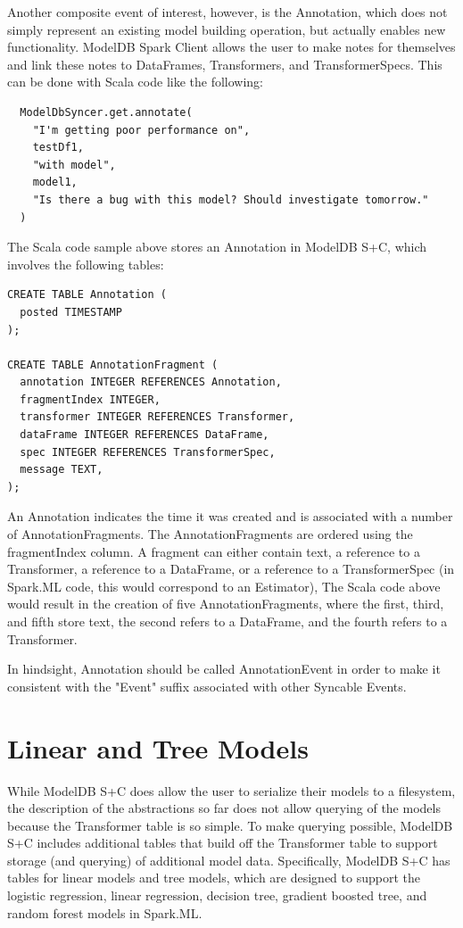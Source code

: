 Another composite event of interest, however, is the Annotation, which does not simply represent
an existing model building operation, but actually enables new functionality. ModelDB Spark Client allows the user
to make notes for themselves and link these notes to DataFrames, Transformers, and TransformerSpecs. This can be done
with Scala code like the following:

\begin{verbatim}
  ModelDbSyncer.get.annotate(
    "I'm getting poor performance on", 
    testDf1, 
    "with model", 
    model1, 
    "Is there a bug with this model? Should investigate tomorrow."
  )
\end{verbatim}

The Scala code sample above stores an Annotation in ModelDB S+C, which involves
the following tables:

\begin{verbatim}
CREATE TABLE Annotation (
  posted TIMESTAMP
);

CREATE TABLE AnnotationFragment (
  annotation INTEGER REFERENCES Annotation,
  fragmentIndex INTEGER,
  transformer INTEGER REFERENCES Transformer,
  dataFrame INTEGER REFERENCES DataFrame,
  spec INTEGER REFERENCES TransformerSpec,
  message TEXT,
);
\end{verbatim}

An Annotation indicates the time it was created and is associated with a number
of AnnotationFragments. The AnnotationFragments are ordered using the fragmentIndex
column. A fragment can either contain text, a reference to a Transformer, a reference
to a DataFrame, or a reference to a TransformerSpec (in Spark.ML code, this would
correspond to an Estimator), The Scala code above would result in the creation
of five AnnotationFragments, where the first, third, and fifth store text, the second
refers to a DataFrame, and the fourth refers to a Transformer.

In hindsight, Annotation should be called AnnotationEvent in order to make
it consistent with the "Event" suffix associated with other Syncable Events.

\section{Linear and Tree Models}

While ModelDB S+C does allow the user to serialize their models to a filesystem,
the description of the abstractions so far does not allow querying of the models
because the Transformer table is so simple. To make querying possible, ModelDB S+C
includes additional tables that build off the Transformer table to support storage
(and querying) of additional model data. Specifically, ModelDB S+C has tables for
linear models and tree models, which are designed to support the logistic regression,
linear regression, decision tree, gradient boosted tree, and random forest models in
Spark.ML.

